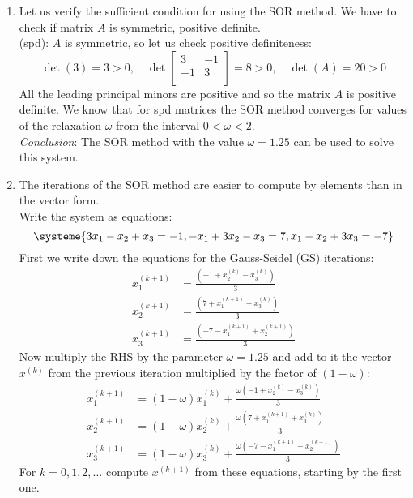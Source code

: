 \documentclass[../main-sheet.tex]{subfiles}
\begin{document}
\begin{soln}\hfill
    \begin{enumerate}[label=(\roman*)]
        \item Let us verify the sufficient condition for using the SOR method. We have to check if matrix \(A\) is symmetric, positive definite.\\
        (spd): \(A\) is symmetric, so let us check positive definiteness:
        \[
            \det(3)=3>0,\quad \det \begin{bmatrix}
                3& -1 \\
                -1& 3 \\
            \end{bmatrix}=8>0, \quad \det(A)=20>0
            \]
            All the leading principal minors are positive and so the matrix \(A\) is positive definite. We know that for spd matrices the SOR method converges for values of the relaxation \(\omega\) from the interval \(0<\omega<2\).\\
            
            
            \emph{Conclusion}: The SOR method with the value \(\omega=1.25\) can be used to solve this system.
            \item The iterations of the SOR method are easier to compute by elements than in the vector form.\\
            Write the system as equations:
            \[
                \systeme{
                    3x_1-x_2+x_3=-1,
                    -x_1+3x_2-x_3=7,
                    x_1-x_2+3x_3=-7
                }
            \]
            First we write down the equations for the Gauss-Seidel (GS) iterations:
            \begin{align*}
                x_1^{(k+1)}&=\frac{\left( -1+x_2^{(k)}-x_3^{(k)} \right)}{3}\\
                x_2^{(k+1)}&=\frac{\left( 7+x_1^{(k+1)}+x_3^{(k)} \right)}{3}\\
                x_3^{(k+1)}&=\frac{\left( -7-x_1^{(k+1)}+x_2^{(k+1)} \right)}{3}
            \end{align*}
            Now multiply the RHS by the parameter \(\omega=1.25\) and add to it the vector \(x^{(k)}\) from the previous iteration multiplied by the factor of \((1-\omega)\):
            \begin{align*}
                x_1^{(k+1)} &= (1-\omega)x_1^{(k)}+ \frac{\omega\left( -1+x_2^{(k)}-x_3^{(k)} \right)}{3}\\
                x_2^{(k+1)} &=(1-\omega)x_2^{(k)}+ \frac{\omega\left( 7+x_1^{(k+1)}+x_3^{(k)} \right)}{3}\\
                x_3^{(k+1)} &= (1-\omega)x_3^{(k)}+\frac{\omega\left( -7-x_1^{(k+1)}+x_2^{(k+1)} \right)}{3}
            \end{align*}
            For \(k=0,1,2,\dots\) compute \(x^{(k+1)}\) from these equations, starting by the first one.\\
            

\end{enumerate}
\end{soln}
\end{document}
